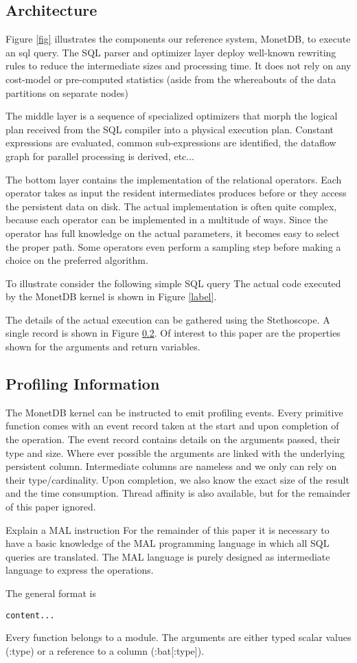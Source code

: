 \subsection{Architecture}
Figure \ref{fig} illustrates the components our reference system, MonetDB,
to execute an sql query. The SQL parser and optimizer layer deploy well-known
rewriting rules to reduce the intermediate sizes and processing time.
It does not rely on any cost-model or pre-computed statistics
(aside from the whereabouts of the data partitions on separate nodes)

The middle layer is a sequence of specialized optimizers that morph the logical
plan received from the SQL compiler into a physical execution plan.
Constant expressions are evaluated, common sub-expressions are identified,
the dataflow graph for parallel processing is derived, etc...

The bottom layer contains the implementation of the relational operators.
Each operator takes as input the resident intermediates produces before
or they access the persistent data on disk.
The actual implementation is often quite complex,
because each operator can be implemented in a multitude of ways.
Since the operator has full knowledge on the actual parameters,
it becomes easy to select the proper path.
Some operators even perform a sampling step before making a choice on the
 preferred algorithm.

To illustrate consider the following simple SQL query
The actual code executed by the MonetDB kernel is shown in Figure \ref{label}.

The details of the actual execution can be gathered using the Stethoscope.
A single record is shown in Figure \ref{}. Of interest to this paper are
the properties shown for the arguments and return variables.

\subsection{Profiling Information}
The MonetDB kernel can be instructed to emit profiling events.
Every primitive function comes with an event record taken at the start and
upon completion of the operation. The event record contains details on the
arguments passed, their type and size. Where ever possible the arguments
are linked with the underlying persistent column. Intermediate columns are
nameless and we only can rely on their type/cardinality.
Upon completion, we also know the exact size of the result and the time consumption.
Thread affinity is also available, but for the remainder of this paper ignored.

Explain a MAL instruction
For the remainder of this paper it is necessary to have a basic knowledge of the
MAL programming language in which all SQL queries are translated.
The MAL language is purely designed as intermediate language to express the operations.

The general format is
\begin{verbatim}
content...
\end{verbatim}
Every function belongs to a module. The arguments are either typed scalar
values (:type) or a reference to a column (:bat[:type]).
